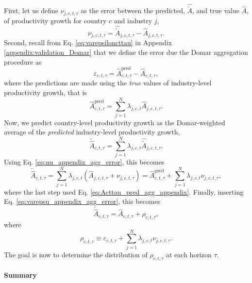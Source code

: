 \documentclass[11pt]{article}
\begin{document}
First, let us define $\nu_{j,c,t,\tau}$ as the error between the predicted, $\hat{\tilde{A}}$, and true value $\hat{A}$, of productivity growth for country $c$ and industry $j$, 
\begin{equation}
\nu_{j,c,t,\tau} = \hat{\tilde{A}}_{j,c,t,\tau} -\hat{A}_{j,c,t,\tau}.
\label{eq:nu_appendix_agg_error}
\end{equation}
Second, recall from Eq. \ref{eq:varepsiloncttau} in Appendix \ref{appendix:validation_Domar} that we define the error due the Domar aggregation procedure as
\begin{equation}
\varepsilon_{c,t,\tau}=  \hat{A}_{c,t,\tau}^\text{pred} - \hat{A}_{c,t,\tau},
\label{eq:varepsu_appendix_agg_error}
\end{equation}
where the predictions are made using the \textit{true} values of industry-level productivity growth, that is
\begin{equation}
\hat{A}_{c,t,\tau}^\text{pred} = \sum_{j=1}^N \lambda_{j,c,t} \hat{A}_{j,c,t,\tau}.
\label{eq:Acttau_pred_agg_appendix}
\end{equation}
Now, we predict country-level productivity growth as the Domar-weighted average of the \textit{predicted} industry-level productivity growth,
\begin{equation}
 \tilde{\hat{A}}_{c,t,\tau} = \sum_{j=1}^N \lambda_{j,c,t} \hat{\tilde{A}}_{j,c,t,\tau}.
\end{equation}
Using Eq. \ref{eq:nu_appendix_agg_error}, this becomes
\begin{equation}
 \tilde{\hat{A}}_{c,t,\tau} = \sum_{j=1}^N \lambda_{j,c,t} (\hat{A}_{j,c,t,\tau} + \nu_{j,c,t,\tau}) = \hat{A}_{c,t,\tau}^\text{pred} + \sum_{j=1}^N \lambda_{j,c,t} \nu_{j,c,t,\tau},
\end{equation}
where the last step used Eq. \ref{eq:Acttau_pred_agg_appendix}. Finally, inserting  Eq. \ref{eq:varepsu_appendix_agg_error}, this becomes
\begin{equation}
 \tilde{\hat{A}}_{c,t,\tau} =  \hat{A}_{c,t,\tau} + \rho_{c,t,\tau},
\end{equation}
where
\begin{equation}
\label{eq_agg_combined_error}
\rho_{c,t,\tau} \equiv \varepsilon_{c,t,\tau} + \sum_{j=1}^N \lambda_{j,c,t} \nu_{j,c,t,\tau}.
\end{equation}
The goal is now to determine the distribution of $\rho_{c,t,\tau}$ at each horizon $\tau$.

\paragraph{Summary}
\end{document}
